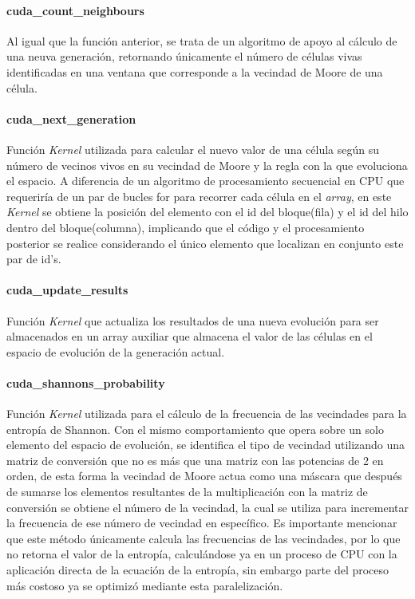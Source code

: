 \documentclass[]{article}
\begin{document}
			\paragraph{cuda\_count\_neighbours}
				Al igual que la función anterior, se trata de un algoritmo de apoyo al cálculo de una neuva generación, retornando únicamente el número de células vivas identificadas en una ventana que corresponde a la vecindad de Moore de una célula.
				
			\paragraph{cuda\_next\_generation}
				Función \textit{Kernel} utilizada para calcular el nuevo valor de una célula según su número de vecinos vivos en su vecindad de Moore y la regla con la que evoluciona el espacio. A diferencia de un algoritmo de procesamiento secuencial en CPU que requeriría de un par de bucles for para recorrer cada célula en el \textit{array}, en este \textit{Kernel} se obtiene la posición del elemento con el id del bloque(fila) y el id del hilo dentro del bloque(columna), implicando que el código y el procesamiento posterior se realice considerando el único elemento que localizan en conjunto este par de id's.
				
			\paragraph{cuda\_update\_results}
				Función \textit{Kernel} que actualiza los resultados de una nueva evolución para ser almacenados en un array auxiliar que almacena el valor de las células en el espacio de evolución de la generación actual.
				
			\paragraph{cuda\_shannons\_probability}
				Función \textit{Kernel} utilizada para el cálculo de la frecuencia de las vecindades para la entropía de Shannon. Con el mismo comportamiento que opera sobre un solo elemento del espacio de evolución, se identifica el tipo de vecindad utilizando una matriz de conversión que no es más que una matriz con las potencias de 2 en orden, de esta forma la vecindad de Moore actua como una máscara que después de sumarse los elementos resultantes de la multiplicación con la matriz de conversión se obtiene el número de la vecindad, la cual se utiliza para incrementar la frecuencia de ese número de vecindad en específico.
				Es importante mencionar que este método únicamente calcula las frecuencias de las vecindades, por lo que no retorna el valor de la entropía, calculándose ya en un proceso de CPU con la aplicación directa de la ecuación de la entropía, sin embargo parte del proceso más costoso ya se optimizó mediante esta paralelización.
				
\end{document}
